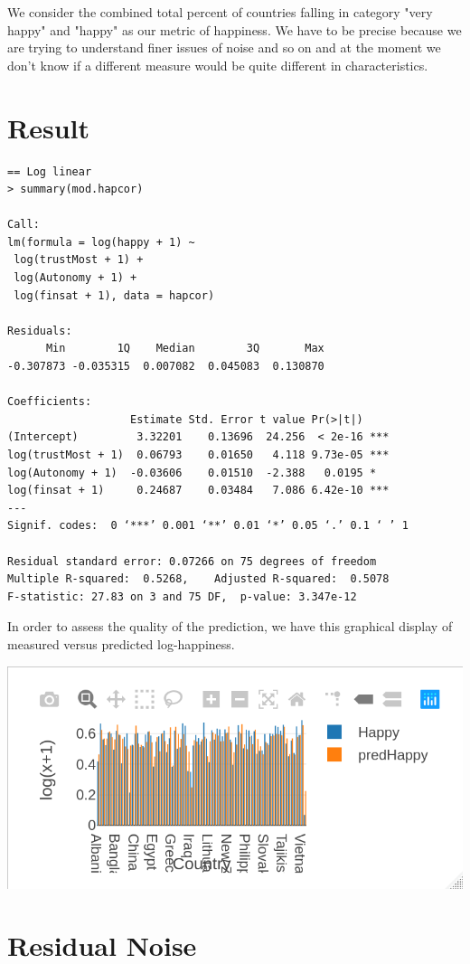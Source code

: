 \documentclass{amsart}
\begin{document}
We consider the combined total percent of countries falling in category "very happy" and "happy" as our metric of happiness.  We have to be precise because we are trying to understand finer issues of noise and so on and at the moment we don't know if a different measure would be quite different in characteristics.

\section{Result}

\begin{verbatim}
== Log linear
> summary(mod.hapcor)

Call:
lm(formula = log(happy + 1) ~
 log(trustMost + 1) + 
 log(Autonomy + 1) + 
 log(finsat + 1), data = hapcor)

Residuals:
      Min        1Q    Median        3Q       Max 
-0.307873 -0.035315  0.007082  0.045083  0.130870 

Coefficients:
                   Estimate Std. Error t value Pr(>|t|)    
(Intercept)         3.32201    0.13696  24.256  < 2e-16 ***
log(trustMost + 1)  0.06793    0.01650   4.118 9.73e-05 ***
log(Autonomy + 1)  -0.03606    0.01510  -2.388   0.0195 *  
log(finsat + 1)     0.24687    0.03484   7.086 6.42e-10 ***
---
Signif. codes:  0 ‘***’ 0.001 ‘**’ 0.01 ‘*’ 0.05 ‘.’ 0.1 ‘ ’ 1

Residual standard error: 0.07266 on 75 degrees of freedom
Multiple R-squared:  0.5268,	Adjusted R-squared:  0.5078 
F-statistic: 27.83 on 3 and 75 DF,  p-value: 3.347e-12
\end{verbatim}

In order to assess the quality of the prediction, we have this graphical display of measured versus predicted log-happiness.

\includegraphics[scale=0.8]{predhap.png}

\section{Residual Noise}
\end{document}
